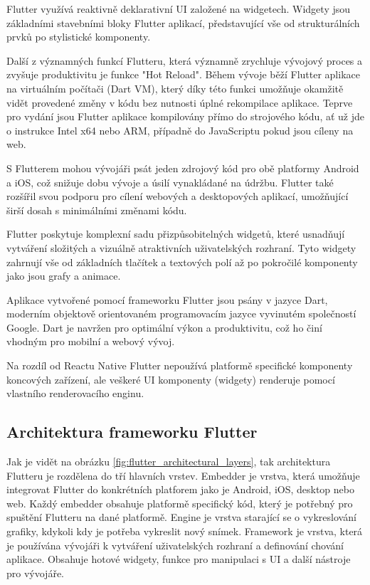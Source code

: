 Flutter využívá reaktivně deklarativní UI založené na widgetech. \cite{flutterUI} Widgety jsou základními stavebními 
bloky Flutter aplikací, představující vše od strukturálních prvků po stylistické komponenty. \cite{flutterWidgets}

Další z významných funkcí Flutteru, která významně zrychluje vývojový proces a zvyšuje produktivitu je funkce "Hot Reload". 
Během vývoje běží Flutter aplikace na virtuálním počítači (Dart VM), který díky této funkci umožňuje okamžitě vidět provedené změny
v kódu bez nutnosti úplné rekompilace aplikace. \cite{flutterHotReload} Teprve pro vydání jsou Flutter aplikace kompilovány přímo do strojového kódu, 
ať už jde o instrukce Intel x64 nebo ARM, případně do JavaScriptu pokud jsou cíleny na web. \cite{flutterArchOverview}


S Flutterem mohou vývojáři psát jeden zdrojový kód pro obě platformy Android a iOS, což snižuje dobu vývoje a úsilí 
vynakládané na údržbu. Flutter také rozšířil svou podporu pro cílení webových a desktopových aplikací, umožňující širší dosah s minimálními změnami kódu. \cite{flutter}

Flutter poskytuje komplexní sadu přizpůsobitelných widgetů, které usnadňují vytváření složitých a vizuálně 
atraktivních uživatelských rozhraní. Tyto widgety zahrnují vše od základních tlačítek a textových polí až po 
pokročilé komponenty jako jsou grafy a animace. \cite{flutterWidgets2}

Aplikace vytvořené pomocí frameworku Flutter jsou psány v jazyce Dart, moderním objektově orientovaném programovacím jazyce 
vyvinutém společností Google. Dart je navržen pro optimální výkon a produktivitu, což ho činí vhodným pro mobilní a
webový vývoj. \cite{dart}

Na rozdíl od Reactu Native Flutter nepoužívá platformě specifické komponenty koncových zařízení, ale veškeré UI komponenty (widgety)
renderuje pomocí vlastního renderovacího enginu. \cite{flutterRenderingModel}


\subsection*{Architektura frameworku Flutter} 
Jak je vidět na obrázku \ref{fig:flutter_architectural_layers}, tak architektura Flutteru je rozdělena do tří hlavních vrstev. \cite{flutterArchOverview}
Embedder je vrstva, která umožňuje integrovat Flutter do konkrétních platforem jako je Android, iOS, desktop nebo web. 
Každý embedder obsahuje platformě specifický kód, který je potřebný pro spuštění Flutteru na dané platformě.
Engine je vrstva starající se o vykreslování grafiky, kdykoli kdy je potřeba vykreslit nový snímek. \cite{flutterArchOverview} 
Framework je vrstva, která je používána vývojáři k vytváření uživatelských rozhraní a definování chování aplikace. 
Obsahuje hotové widgety, funkce pro manipulaci s UI a další nástroje pro vývojáře. \cite{flutterArchOverview} 


